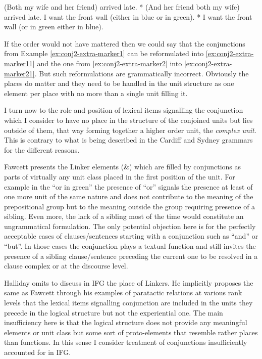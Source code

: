 \begin{exe}
	\ex\label{ex:conj2-extra-marker1}
	(Both my wife and her friend) arrived late.  
	\ex\label{ex:conj2-extra-marker11} * (And her friend both my wife) arrived late.
	\ex\label{ex:conj2-extra-marker2}
	I want the front wall (either in blue or in green). 
	\ex\label{ex:conj2-extra-marker21}
	* I want the front wall (or in green either in blue). 
\end{exe}

If the order would not have mattered then we could say that the conjunctions from Example \ref{ex:conj2-extra-marker1} can be reformulated into \ref{ex:conj2-extra-marker11} and the one from \ref{ex:conj2-extra-marker2} into \ref{ex:conj2-extra-marker21}. But such reformulations are grammatically incorrect. Obviously the places do matter and they need to be handled in the unit structure as one element per place with no more than a single unit filling it.

I turn now to the role and position of lexical items signalling the conjunction which I consider to have no place in the structure of the conjoined units but lies outside of them, that way forming together a higher order unit, the \textit{complex unit}. This is contrary to what is being described in the Cardiff and Sydney grammars for the different reasons. 

Fawcett presents the Linker elements (\&) which are filled by conjunctions as parts of virtually any unit class placed in the first position of the unit. For example in the ``or in green'' the presence of ``or'' signals the presence at least of one more unit of the same nature and does not contribute to the meaning of the prepositional group but to the meaning outside the group requiring presence of a sibling. Even more, the lack of a sibling most of the time would constitute an ungrammatical formulation. The only potential objection here is for the perfectly acceptable cases of clauses/sentences starting with a conjunction such as ``and'' or ``but''. In those cases the conjunction plays a textual function and still invites the presence of a sibling clause/sentence preceding the current one to be resolved in a clause complex or at the discourse level. 

Halliday omits to discuss in IFG \citep{Halliday2013} the place of Linkers. He implicitly proposes the same as Fawcett through his examples of paratactic relations at various rank levels \citep[422, 534, 564, 566]{Halliday2013} that the lexical items signalling conjunction are included in the units they precede in the logical structure but not the experiential one. The main insufficiency here is that the logical structure does not provide any meaningful elements or unit class but some sort of proto-elements that resemble rather places than functions. In this sense I consider treatment of conjunctions insufficiently accounted for in IFG.  

